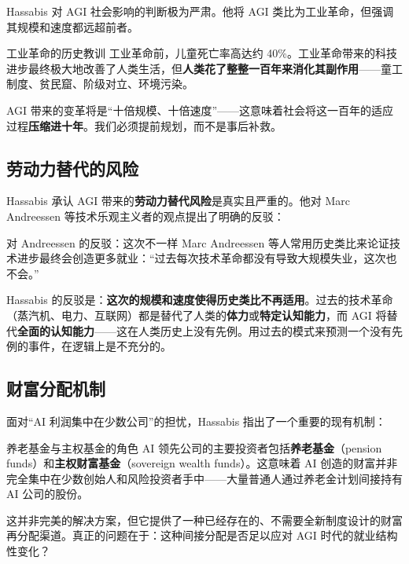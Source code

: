 \documentclass[a4paper]{article}
\begin{document}
Hassabis 对 AGI 社会影响的判断极为严肃。他将 AGI 类比为工业革命，但强调其规模和速度都远超前者。

\begin{importantbox}{工业革命的历史教训}
工业革命前，儿童死亡率高达约 40\%。工业革命带来的科技进步最终极大地改善了人类生活，但\textbf{人类花了整整一百年来消化其副作用}——童工制度、贫民窟、阶级对立、环境污染。

AGI 带来的变革将是``十倍规模、十倍速度''——这意味着社会将这一百年的适应过程\textbf{压缩进十年}。我们必须提前规划，而不是事后补救。
\end{importantbox}

\subsection{劳动力替代的风险}

Hassabis 承认 AGI 带来的\textbf{劳动力替代风险}是真实且严重的。他对 Marc Andreessen 等技术乐观主义者的观点提出了明确的反驳：

\begin{warningbox}{对 Andreessen 的反驳：这次不一样}
Marc Andreessen 等人常用历史类比来论证技术进步最终会创造更多就业：``过去每次技术革命都没有导致大规模失业，这次也不会。''

Hassabis 的反驳是：\textbf{这次的规模和速度使得历史类比不再适用}。过去的技术革命（蒸汽机、电力、互联网）都是替代了人类的\textbf{体力}或\textbf{特定认知能力}，而 AGI 将替代\textbf{全面的认知能力}——这在人类历史上没有先例。用过去的模式来预测一个没有先例的事件，在逻辑上是不充分的。
\end{warningbox}

\subsection{财富分配机制}

面对``AI 利润集中在少数公司''的担忧，Hassabis 指出了一个重要的现有机制：

\begin{knowledgebox}{养老基金与主权基金的角色}
AI 领先公司的主要投资者包括\textbf{养老基金}（pension funds）和\textbf{主权财富基金}（sovereign wealth funds）。这意味着 AI 创造的财富并非完全集中在少数创始人和风险投资者手中——大量普通人通过养老金计划间接持有 AI 公司的股份。

这并非完美的解决方案，但它提供了一种已经存在的、不需要全新制度设计的财富再分配渠道。真正的问题在于：这种间接分配是否足以应对 AGI 时代的就业结构性变化？
\end{knowledgebox}
\end{document}
